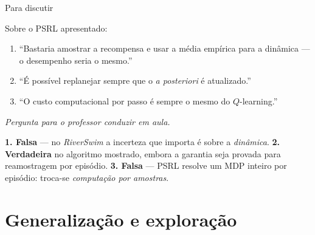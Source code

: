 \documentclass[aspectratio=169, 11pt]{beamer}
\newcommand{\paradiscussao}{\smallskip
  {\footnotesize\color{rlCinza}\itshape Pergunta para o professor conduzir em aula.}}
\begin{document}
\begin{frame}{Para discutir}
  \begin{quizbox}{}
    Sobre o PSRL apresentado:
    \begin{enumerate}
      \item ``Bastaria amostrar a recompensa e usar a média empírica para a dinâmica ---
            o desempenho seria o mesmo.''
      \item ``É possível replanejar sempre que o \textit{a posteriori} é atualizado.''
      \item ``O custo computacional por passo é sempre o mesmo do $Q$-learning.''
    \end{enumerate}
    \paradiscussao
  \end{quizbox}
  \pause
  \begin{respbox}
    \textbf{1. Falsa} --- no \textit{RiverSwim} a incerteza que importa é sobre a
    \emph{dinâmica}.\quad
    \textbf{2. Verdadeira} no algoritmo mostrado, embora a garantia seja provada para
    reamostragem por episódio.\quad
    \textbf{3. Falsa} --- PSRL resolve um MDP inteiro por episódio: troca-se
    \emph{computação por amostras}.
  \end{respbox}
\end{frame}
\section{Generalização e exploração}
\end{document}
